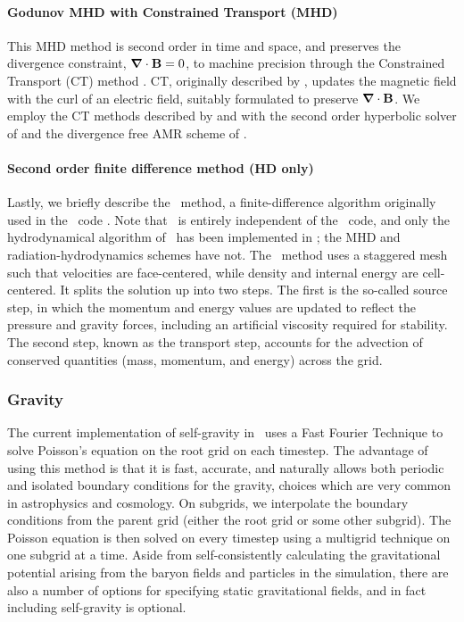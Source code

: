 \paragraph{Godunov MHD with Constrained Transport (MHD)}
This MHD method is second order in time and space, and preserves the
divergence constraint, $\bm{\nabla} \cdot \mathbf{B} = 0$, to machine precision
through the Constrained Transport (CT) method \citep{Collins10}.  CT, originally
described by \citet{Evans88}, updates the magnetic field with the curl
of an electric field, suitably formulated to preserve $\bm{\nabla} \cdot
\mathbf{B}$.  We employ the CT methods described by \citet{Balsara99} and
\citet{Gardiner05} with the second order hyperbolic
solver of \citet{Li08a} and the divergence free AMR scheme of
\citet{Balsara01}.

\paragraph{Second order finite difference method (HD only)}

Lastly, we briefly describe the \zeus\ method, a finite-difference
algorithm originally used in the \zeus\ code \citep{Stone92a}. Note
that \enzo\ is entirely independent of the \zeus\ code, and only the
hydrodynamical algorithm of \zeus\ has been implemented in \enzo; the
MHD and radiation-hydrodynamics schemes have not. The \zeus\ method
uses a staggered mesh such that velocities are face-centered, while
density and internal energy are cell-centered.  It splits the solution
up into two steps. The first is the so-called source step, in which
the momentum and energy values are updated to reflect the pressure and
gravity forces, including an artificial viscosity required for
stability. The second step, known as the transport step, accounts for
the advection of conserved quantities (mass, momentum, and energy)
across the grid.

\subsubsection{Gravity}

The current implementation of self-gravity in \enzo\ uses a Fast
Fourier Technique \citep{Hockney88} to solve Poisson's equation on the
root grid on each timestep.  The advantage of using this method is
that it is fast, accurate, and naturally allows both periodic and
isolated boundary conditions for the gravity, choices which are very
common in astrophysics and cosmology.  On subgrids, we interpolate the
boundary conditions from the parent grid (either the root grid or some
other subgrid). The Poisson equation is then solved on every timestep
using a multigrid technique on one subgrid at a time. Aside from
self-consistently calculating the gravitational potential arising from
the baryon fields and particles in the simulation, there are also a
number of options for specifying static gravitational fields, and in
fact including self-gravity is optional.

